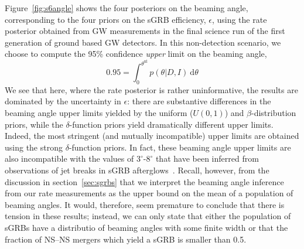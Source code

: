 \documentclass[twocolumn,nofootinbib]{revtex4-1}
\newcommand{\diff}{{\mathrm d}}
\newcommand{\BNS}{\ac{NS}--\ac{NS}\xspace}
\begin{document}

Figure~\ref{fig:s6angle} shows the four posteriors on the beaming angle, corresponding to the four priors on the \ac{sGRB} efficiency, $\epsilon$, using the rate posterior obtained from \ac{GW} measurements in the final science run of the first generation of ground based \ac{GW} detectors.
In this non-detection scenario, we choose to compute the 95\% confidence \emph{upper} limit on the beaming angle,
\begin{equation}
    \label{eq:beaming_upper_limit}
    0.95 = \int_0^{\theta^{\mathrm{ul}}} p(\theta|D,I)~\diff \theta
\end{equation}
%
We see that here, where the rate posterior is rather uninformative, the results are dominated by the uncertainty in $\epsilon$: there are substantive differences in the beaming angle upper limits yielded by the uniform ($U(0,1)$) and $\beta$-distribution priors, while the $\delta$-function priors yield dramatically different upper limits.
Indeed, the most stringent (and mutually incompatible) upper limits are obtained using the strong $\delta$-function priors.
In fact, these beaming angle upper limits are also incompatible with the values of $3^{\circ}\mbox{-}8^{\circ}$ that have been inferred from observations of jet breaks in \ac{sGRB} afterglows~\cite{Fong:2013lba,2006MNRAS.367L..42P, 2012A&A...538L...7N}.
Recall, however, from the discussion in section~\ref{sec:sgrbs} that we interpret the beaming angle inference from our rate measurements as the upper bound on the mean of a population of beaming angles.
It would, therefore, seem premature to conclude that there is tension in these results; instead, we can only state that either the population of \acp{sGRB} have a distributio of beaming angles with some finite width or that the fraction of \BNS mergers which yield a \ac{sGRB} is smaller than 0.5.
\end{document}
